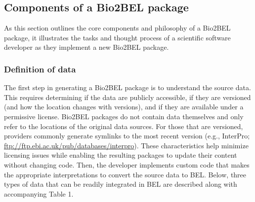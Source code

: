 \documentclass{bmcart}
\begin{document}
\subsection*{Components of a Bio2BEL package}

As this section outlines the core components and philosophy of a Bio2BEL package, it illustrates the tasks and thought process of a scientific software developer as they implement a new Bio2BEL package.

\subsubsection*{Definition of data}

The first step in generating a Bio2BEL package is to understand the source data.
This requires determining if the data are publicly accessible, if they are versioned (and how the location changes with versions), and if they are available under a permissive license.
Bio2BEL packages do not contain data themselves and only refer to the locations of the original data sources.
For those that are versioned, providers commonly generate symlinks to the most recent version (e.g., InterPro; \url{ftp://ftp.ebi.ac.uk/pub/databases/interpro}).
These characteristics help minimize licensing issues while enabling the resulting packages to update their content without changing code.
Then, the developer implements custom code that makes the appropriate interpretations to convert the source data to BEL.
Below, three types of data that can be readily integrated in BEL are described along with accompanying Table 1.
\end{document}
